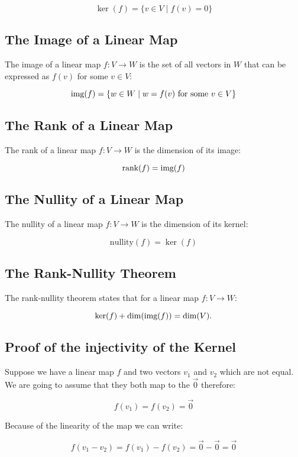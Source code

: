 \[
    \ker(f) = \{ v \in V \mid f(v) = 0 \}
\]

\subsection{The Image of a Linear Map}

The image of a linear map \( f: V \to W \) is the set of all vectors in \( W \) that can be expressed 
as \( f(v) \) for some \( v \in V \):

\[
    \text{img}(f) = \{ w \in W \mid w = f(v) \text{ for some } v \in V \}
\]
 
\subsection{The Rank of a Linear Map}

The rank of a linear map \( f: V \to W \) is the dimension of its image:

\[
    \text{rank}(f) = \text{img}(f)
\]

\subsection{The Nullity of a Linear Map}

The nullity of a linear map \( f: V \to W \) is the dimension of its kernel:
    
\[
    \text{nullity}(f) = \ker(f)
\]

\subsection{The Rank-Nullity Theorem}

The rank-nullity theorem states that for a linear map \( f: V \to W \):

\[
    \ker(f) + \dim(\text{img}(f)) = \dim(V).
\]

\subsection{Proof of the injectivity of the Kernel}

Suppose we have a linear map \(f\) and two vectors \(v_1\) and \(v_2\) which are not equal. 
We are going to assume that they both map to the \(\vec{0}\) therefore:

\[
    f(v_1) = f(v_2) = \vec{0}
\]

Because of the linearity of the map we can write:

\[
    f(v_1 - v_2) = f(v_1) - f(v_2) = \vec{0} - \vec{0} = \vec{0}
\]

